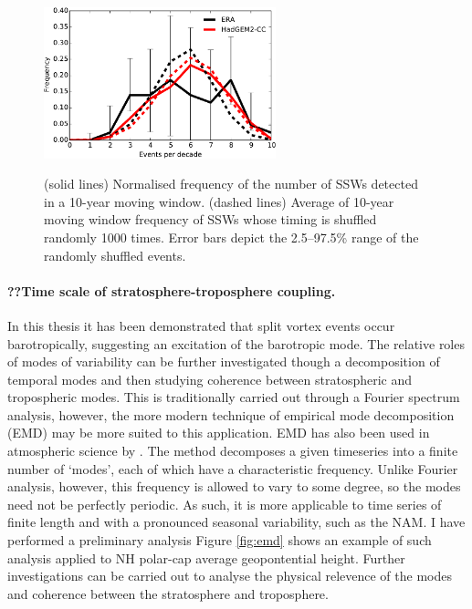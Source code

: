 \begin{figure}[t]
  \centering
  \noindent\includegraphics[width=0.6\textwidth,angle=0]{figures/chapter-conclusions/events_decadal.pdf}\\
  \caption[Decadal variability of SSWs]{(solid lines) Normalised frequency of
    the number of SSWs detected in a 10-year moving window. (dashed lines)
    Average of 10-year moving window frequency of SSWs whose timing is shuffled
    randomly 1000 times. Error bars depict the 2.5--97.5\%
    range of the randomly shuffled events.}\label{fig:decadal}
\end{figure}



\paragraph{??Time scale of stratosphere-troposphere coupling.} In this thesis it
has been demonstrated that split vortex events occur barotropically, suggesting
an excitation of the barotropic mode. The relative roles of modes of variability
can be further investigated though a decomposition of temporal modes and then
studying coherence between stratospheric and tropospheric modes. This is
traditionally carried out through a Fourier spectrum analysis, however, the more
modern technique of empirical mode decomposition (EMD) \citep{Huang1998} may be
more suited to this application. EMD has also been used in atmospheric science
by \citet{Coughlin2004}. The method decomposes a given timeseries into a finite
number of `modes', each of which have a characteristic frequency. Unlike Fourier
analysis, however, this frequency is allowed to vary to some degree, so the
modes need not be perfectly periodic. As such, it is more applicable to time
series of finite length and with a pronounced seasonal variability, such as the
NAM. I have performed a preliminary analysis Figure \ref{fig:emd} shows an
example of such analysis applied to NH polar-cap average geopontential
height. Further investigations can be carried out to analyse the physical
relevence of the modes and coherence between the stratosphere and troposphere.

